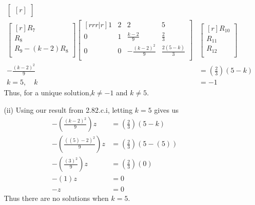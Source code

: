 \documentclass[12pt]{article}
\begin{document}
\begin{enumerate}
\begin{enumerate}
\begin{enumerate}
\begin{align*}
\begin{bmatrix}[r]
		\end{bmatrix}\\
		\begin{bmatrix}[r]
		R_7\\
		R_8\\
		R_9 - (k-2)R_8\\
		\end{bmatrix}
		\begin{bmatrix}[rrr|r]
		1 & 2 & 2 & 5\\
		0 & 1 & \frac{k-2}{9} & \frac{2}{3}\\
		0 & 0 & -\frac{(k-2)^2}{9} & \frac{2(5-k)}{3}\\
		\end{bmatrix}&
		\begin{bmatrix}[r]
		R_{10}\\ R_{11}\\ R_{12}\\
		\end{bmatrix}\\
		-\frac{(k-2)^2}{9} &= (\frac{2}{3})(5-k)\\
		k = 5, \quad k &= -1
		\end{align*}
		Thus, for a unique solution,$k \neq -1$ and $k \neq 5$. 
		\item [(ii)]
		Using our result from 2.82.c.i, letting $k = 5$ gives us
		\begin{align*}
		-(\frac{(k-2)^2}{9})z &= (\frac{2}{3})(5-k)\\
		-(\frac{((5)-2)^2}{9})z &= (\frac{2}{3})(5-(5))\\
		-(\frac{(3)^2}{9})z &= (\frac{2}{3})(0)\\
		-(1)z &= 0\\
		-z &= 0
		\end{align*}
		Thus there are no solutions when $k = 5$.
		

\end{enumerate}
\end{enumerate}
\end{enumerate}
\end{document}

